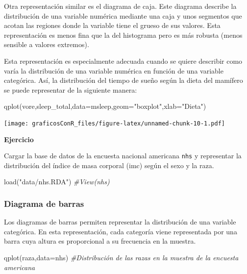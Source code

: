 \documentclass[
]{article}
\newenvironment{Shaded}{\begin{snugshade}}{\end{snugshade}}
\newcommand{\AttributeTok}[1]{\textcolor[rgb]{0.77,0.63,0.00}{#1}}
\newcommand{\CommentTok}[1]{\textcolor[rgb]{0.56,0.35,0.01}{\textit{#1}}}
\newcommand{\FunctionTok}[1]{\textcolor[rgb]{0.00,0.00,0.00}{#1}}
\newcommand{\NormalTok}[1]{#1}
\newcommand{\StringTok}[1]{\textcolor[rgb]{0.31,0.60,0.02}{#1}}
\newcounter{ejcnt}[section]
\numberwithin{ejcnt}{section}
\newenvironment{ej}[1][]{%
	\refstepcounter{ejcnt}%
	\par\medskip%
	\noindent%
	\textbf{Ejercicio \theejcnt \;\;}%
	\rmfamily%
}{\medskip}
\begin{document}
Otra representación similar es el diagrama de caja. Este diagrama describe la distribución de una variable numérica mediante una caja y unos segmentos que acotan las regiones donde la variable tiene el grueso de sus valores. Esta representación es menos fina que la del histograma pero es más robusta (menos sensible a valores extremos).

Esta representación es especialmente adecuada cuando se quiere describir como varía la distribución de una variable numérica en función de una variable categórica. Así, la distribución del tiempo de sueño según la dieta del mamífero se puede representar de la siguiente manera:

\begin{Shaded}
\begin{Highlighting}[]
\FunctionTok{qplot}\NormalTok{(vore,sleep\_total,}\AttributeTok{data=}\NormalTok{msleep,}\AttributeTok{geom=}\StringTok{"boxplot"}\NormalTok{,}\AttributeTok{xlab=}\StringTok{"Dieta"}\NormalTok{)}
\end{Highlighting}
\end{Shaded}

\texttt{[image: graficosConR\_files/figure-latex/unnamed-chunk-10-1.pdf]}

\begin{ej}
Cargar la base de datos de la encuesta nacional americana \texttt{nhs} y
representar la distribución del índice de masa corporal (imc) según el
sexo y la raza.
\end{ej}

\begin{Shaded}
\begin{Highlighting}[]
\FunctionTok{load}\NormalTok{(}\StringTok{"data/nhs.RDA"}\NormalTok{)}
\CommentTok{\#View(nhs)}
\end{Highlighting}
\end{Shaded}

\hypertarget{diagrama-de-barras}{%
\subsubsection{Diagrama de barras}\label{diagrama-de-barras}}

Los diagramas de barras permiten representar la distribución de una variable categórica. En esta representación, cada categoría viene representada por una barra cuya altura es proporcional a su frecuencia en la muestra.

\begin{Shaded}
\begin{Highlighting}[]
\FunctionTok{qplot}\NormalTok{(raza,}\AttributeTok{data=}\NormalTok{nhs) }\CommentTok{\#Distribución de las razas en la muestra de la encuesta americana }
\end{Highlighting}
\end{Shaded}
\end{document}
